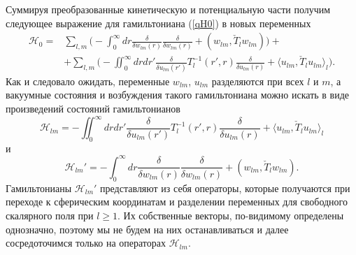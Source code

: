 \documentclass[12pt]{article}
\newcommand{\HH}{\mathscr{H}}
\begin{document}
    Суммируя преобразованные кинетическую и потенциальную части
    получим следующее выражение для гамильтониана
(\ref{qH0})
    в новых переменных
\begin{align*}
    \HH_{0} =& \sum_{l,m} \bigl( -\int_{0}^{\infty} dr
	\frac{\delta}{\delta w_{lm}(r)} \frac{\delta}{\delta w_{lm}(r)}
	    + (w_{lm},\check{T}_{l} w_{lm})\bigr)+\\
    &+ \sum_{l,m} \bigl(-\iint_{0}^{\infty} dr dr'
    \frac{\delta}{\delta u_{lm}(r')} T_{l}^{-1}(r',r)
	\frac{\delta}{\delta u_{lm}(r)}
	    + \langle u_{lm}, \check{T}_{l} u_{lm}\rangle_{l} \bigr).
\end{align*}
    Как и следовало ожидать, переменные
$ w_{lm} $, 
$ u_{lm} $
    разделяются при всех
$ l $ и $ m $,
    а вакуумные состояния и возбуждения такого гамильтониана можно искать
    в виде произведений состояний гамильтонианов
\begin{equation}
\label{Hlm}
    \HH_{lm} = -\iint_{0}^{\infty} dr dr'
    \frac{\delta}{\delta u_{lm}(r')} T_{l}^{-1}(r',r)
	\frac{\delta}{\delta u_{lm}(r)}
	+ \langle u_{lm}, \check{T}_{l}u_{lm}\rangle_{l}
\end{equation}
    и
\begin{equation*}
    \HH_{lm}' = -\int_{0}^{\infty} dr
	\frac{\delta}{\delta w_{lm}(r)} \frac{\delta}{\delta w_{lm}(r)}
	    + (w_{lm},\check{T}_{l} w_{lm}) .
\end{equation*}
    Гамильтонианы
$ \HH_{lm}' $
    представляют из себя операторы, которые получаются при
    переходе к сферическим координатам и разделении переменных для
    свободного скалярного поля при
$ l \geq 1 $.
    Их собственные векторы, по-видимому определены однозначно,
    поэтому мы не будем на них останавливаться и
    далее сосредоточимся только на операторах
$ \HH_{lm} $.
\end{document}
